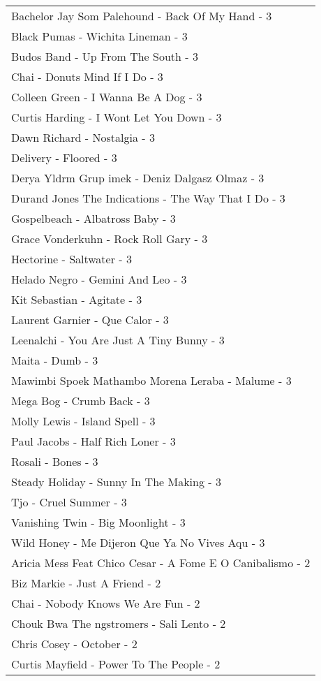 \documentclass[
]{article}
\begin{document}
\begin{longtable}{l}
Bachelor Jay Som Palehound - Back Of My Hand - 3 \\ 
Black Pumas - Wichita Lineman - 3 \\ 
Budos Band - Up From The South - 3 \\ 
Chai - Donuts Mind If I Do - 3 \\ 
Colleen Green - I Wanna Be A Dog - 3 \\ 
Curtis Harding - I Wont Let You Down - 3 \\ 
Dawn Richard - Nostalgia - 3 \\ 
Delivery - Floored - 3 \\ 
Derya Yldrm Grup imek - Deniz Dalgasz Olmaz - 3 \\ 
Durand Jones The Indications - The Way That I Do - 3 \\ 
Gospelbeach - Albatross Baby - 3 \\ 
Grace Vonderkuhn - Rock Roll Gary - 3 \\ 
Hectorine - Saltwater - 3 \\ 
Helado Negro - Gemini And Leo - 3 \\ 
Kit Sebastian - Agitate - 3 \\ 
Laurent Garnier - Que Calor - 3 \\ 
Leenalchi - You Are Just A Tiny Bunny - 3 \\ 
Maita - Dumb - 3 \\ 
Mawimbi Spoek Mathambo Morena Leraba - Malume - 3 \\ 
Mega Bog - Crumb Back - 3 \\ 
Molly Lewis - Island Spell - 3 \\ 
Paul Jacobs - Half Rich Loner - 3 \\ 
Rosali - Bones - 3 \\ 
Steady Holiday - Sunny In The Making - 3 \\ 
Tjo - Cruel Summer - 3 \\ 
Vanishing Twin - Big Moonlight - 3 \\ 
Wild Honey - Me Dijeron Que Ya No Vives Aqu - 3 \\ 
Aricia Mess Feat Chico Cesar - A Fome E O Canibalismo - 2 \\ 
Biz Markie - Just A Friend - 2 \\ 
Chai - Nobody Knows We Are Fun - 2 \\ 
Chouk Bwa The ngstromers - Sali Lento - 2 \\ 
Chris Cosey - October - 2 \\ 
Curtis Mayfield - Power To The People - 2 \\ 

\end{longtable}
\end{document}
